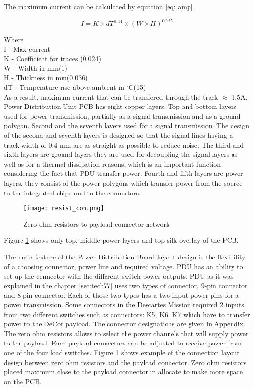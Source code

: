 The maximum current can be calculated by equation \ref{eq: amp}

\begin{equation}\label{eq: amp}
I = K \times dT^{0.44} \times (W \times H)^{0.725}
\end{equation}

Where\\

I - Max current\\
K - Coefficient for traces (0.024)\\
W - Width in mm(1)\\
H - Thickness in mm(0.036) \\
dT - Temperature rise above ambient in $^\circ$C(15)\\

As a result, maximum current that can be transfered through the track $\approx$ 1.5A.\\ 

Power Distribution Unit PCB has eight copper layers. Top and bottom layers used for power transmission, partially as a signal transmission and as a ground polygon. Second and the seventh layers used for a signal transmission. The design of the second and seventh layers is designed so that the signal lines having a track width of 0.4 mm are as straight as possible to reduce noise. The third and sixth layers are ground layers they are used for decoupling the signal layers as well as for a thermal dissipation reasons, which is an important function considering the fact that PDU  transfer power. Fourth and fifth layers are power layers, they consist of the power polygons which transfer power from the source to the integrated chips and to the connectors.   

\begin{figure}[h]
	\centering
	\texttt{[image: resist\_con.png]}
	\caption{Zero ohm resistors to payload connector network}
	\label{fig: res}
\end{figure} 


Figure \ref{fig: res} shows only top, middle power layers and top silk overlay of the PCB.

  
The main feature of the Power Distribution Board layout design is the flexibility of a choosing connector, power line and required voltage. PDU has an ability to set up the connector with the different switch power outputs. PDU as it was explained in the chapter \ref{sec:tech77} uses two types of connector, 9-pin connector and 8-pin connector. Each of those two types has a two input power pins for a power transmission.  Some connectors in the Descartes Mission required 2 inputs from two different switches such as connectors: K5, K6, K7 which have to transfer power to the DeCor payload. The connector designations are given in Appendix. The zero ohm resistors allows to select the power channels that will supply power to the payload. Each payload connectors can be adjusted to receive power from one of the four load switches. Figure \ref{fig: res} shows example of the connection layout design between zero ohm resistors and the payload connector. Zero ohm resistors placed maximum close to the payload connector in allocate to make more space on the PCB. 

